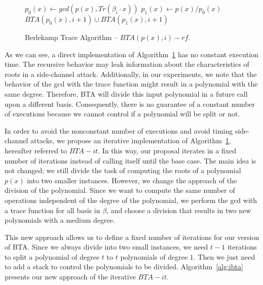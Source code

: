 \begin{figure}[ht]
\begin{algorithm}[H]
    $p_{0}(x) \gets gcd(p(x), Tr(\beta_{i}\cdot x))$\;
    $p_{1}(x) \gets p(x) / p_{0}(x)$ \;
\Return $BTA(p_{0}(x), i + 1) \cup BTA(p_{1}(x), i + 1)$\;
 \caption{Berlekamp Trace Algorithm -- $BTA(p(x), i)-rf$.}
  \label{alg:bta}
\end{algorithm}
\end{figure}

As we can see, a direct implementation of Algorithm~\ref{alg:bta} has no constant execution time. The recursive behavior may leak information about the characteristics of roots in a side-channel attack. Additionally, in our experiments, we note that the behavior of the gcd with the trace function might result in a polynomial with the same degree. Therefore, BTA will divide this input polynomial in a future call upon a different basis. Consequently, there is no guarantee of a constant number of executions because we cannot control if a polynomial will be split or not. 

In order to avoid the nonconstant number of executions and avoid timing side-channel attacks, we propose an iterative implementation of Algorithm~\ref{alg:bta}, hereafter referred to $BTA-it$. In this way, our proposal iterates in a fixed number of iterations instead of calling itself until the base case. The main idea is not changed; we still divide the task of computing the roots of a polynomial $p(x)$ into two smaller instances. However, we change the approach of the division of the polynomial. Since we want to compute the same number of operations independent of the degree of the polynomial, we perform the gcd with a trace function for all basis in $\beta$, and choose a division that results in two new polynomials with a medium degree.

This new approach allows us to define a fixed number of iterations for our version of BTA. Since we always divide into two small instances, we need $t-1$ iterations to split a polynomial of degree $t$ to $t$ polynomials of degree $1$. Then we just need to add a stack to control the polynomials to be divided. Algorithm~\ref{alg:ibta} presents our new approach of the iterative $BTA-it$.

